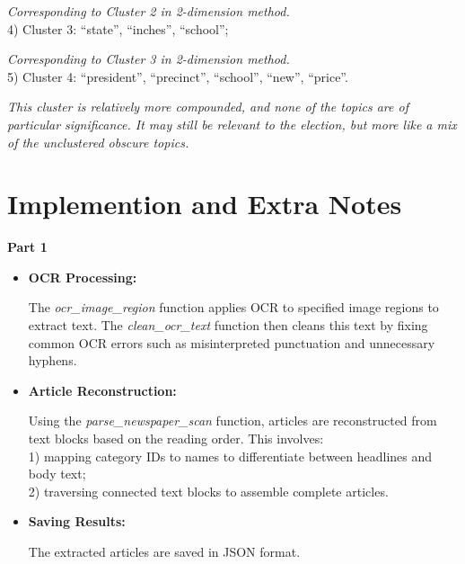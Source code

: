 \documentclass{article}
\begin{document}
\begin{itemize}
\textit{\noindent\quad Corresponding to Cluster 2 in 2-dimension method.}\\
4) Cluster 3: “state”, “inches”, “school”;

\textit{\noindent\quad Corresponding to Cluster 3 in 2-dimension method.}\\
5) Cluster 4: “president”, “precinct”, “school”, “new”, “price”.

\textit{\noindent\quad This cluster is relatively more compounded, and none of the topics are of particular significance. It may still be relevant to the election, but more like a mix of the unclustered obscure topics.}\\
[0.5em]
\end{itemize}

\section{Implemention and Extra Notes}

{\Large \textbf{\noindent\quad Part 1}}
\begin{itemize}
\item \textbf{ OCR Processing:}

The \textit{ocr\_image\_region} function applies OCR to specified image regions to extract text.
The \textit{clean\_ocr\_text} function then cleans this text by fixing common OCR errors such as misinterpreted punctuation and unnecessary hyphens.
\item \textbf{ Article Reconstruction:}

Using the \textit{parse\_newspaper\_scan} function, articles are reconstructed from text blocks based on the reading order. This involves:\\
1) mapping category IDs to names to differentiate between headlines and body text; \\
2) traversing connected text blocks to assemble complete articles.
\item \textbf{ Saving Results:}

The extracted articles are saved in JSON format.\\
\end{itemize}
\end{document}
